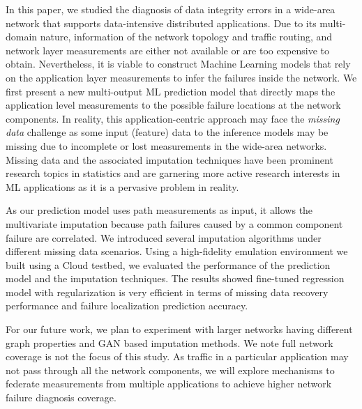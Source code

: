 In this paper, we studied the diagnosis of data integrity errors in a wide-area network that supports data-intensive distributed applications. 
Due to its multi-domain nature, information of the network topology and traffic routing, and network layer measurements are either not available or are too expensive to obtain. Nevertheless, it is viable to construct Machine Learning models that rely on the application layer 
measurements to infer the failures inside the network. We first present a new multi-output ML prediction model that directly maps the application level measurements to the possible failure locations at the network components. In reality, this application-centric approach may face the {\it missing data} challenge as some input (feature) data to the inference models may be missing due to incomplete or lost measurements in the wide-area networks. Missing data and the associated imputation techniques have been prominent research topics in statistics and are garnering more active research interests in ML applications as it is a pervasive problem in reality.
 
As our prediction model uses path measurements as input, it allows the multivariate imputation because path failures caused by a common component failure are correlated. We introduced several imputation algorithms under different missing data scenarios. Using a high-fidelity emulation environment we built using a Cloud testbed, we evaluated the performance of the prediction model and 
the imputation techniques. The results showed fine-tuned regression model with regularization is very efficient in terms of missing data recovery performance and failure localization prediction accuracy.   

For our future work, we plan to experiment with larger networks having different graph properties and GAN based imputation methods. We note full network coverage is not the focus of this study. As traffic in a particular application may not pass through all the network components, we will explore mechanisms to federate measurements from multiple applications to achieve higher network failure diagnosis coverage. 

